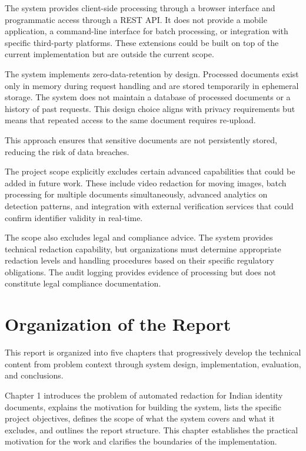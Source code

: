 The system provides client-side processing through a browser interface and programmatic access through a REST API. It does not provide a mobile application, a command-line interface for batch processing, or integration with specific third-party platforms. These extensions could be built on top of the current implementation but are outside the current scope.

The system implements zero-data-retention by design. Processed documents exist only in memory during request handling and are stored temporarily in ephemeral storage. The system does not maintain a database of processed documents or a history of past requests. This design choice aligns with privacy requirements but means that repeated access to the same document requires re-upload.

\bigskip

This approach ensures that sensitive documents are not persistently stored, reducing the risk of data breaches.

\bigskip

The project scope explicitly excludes certain advanced capabilities that could be added in future work. These include video redaction for moving images, batch processing for multiple documents simultaneously, advanced analytics on detection patterns, and integration with external verification services that could confirm identifier validity in real-time.

The scope also excludes legal and compliance advice. The system provides technical redaction capability, but organizations must determine appropriate redaction levels and handling procedures based on their specific regulatory obligations. The audit logging provides evidence of processing but does not constitute legal compliance documentation.

\bigskip

\section{Organization of the Report}

This report is organized into five chapters that progressively develop the technical content from problem context through system design, implementation, evaluation, and conclusions.

Chapter 1 introduces the problem of automated redaction for Indian identity documents, explains the motivation for building the system, lists the specific project objectives, defines the scope of what the system covers and what it excludes, and outlines the report structure. This chapter establishes the practical motivation for the work and clarifies the boundaries of the implementation.

